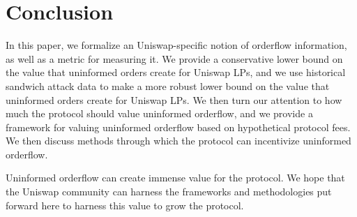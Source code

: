 \section{Conclusion} \label{section:conclusion}
    In this paper, we formalize an Uniswap-specific notion of orderflow information, as well as a metric for measuring it. We provide a conservative lower bound on the value that uninformed orders create for Uniswap LPs, and we use historical sandwich attack data to make a more robust lower bound on the value that uninformed orders create for Uniswap LPs. We then turn our attention to how much the protocol should value uninformed orderflow, and we provide a framework for valuing uninformed orderflow based on hypothetical protocol fees. We then discuss methods through which the protocol can incentivize uninformed orderflow.

    Uninformed orderflow can create immense value for the protocol. We hope that the Uniswap community can harness the frameworks and methodologies put forward here to harness this value to grow the protocol.